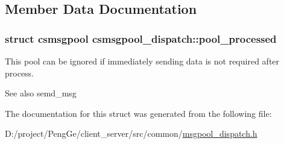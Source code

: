 \subsection{Member Data Documentation}
\hypertarget{structcsmsgpool__dispatch_adcf1e4f0175a47fcfc0283971dbdef57}{}
\subsubsection[{pool\+\_\+processed}]{\setlength{\rightskip}{0pt plus 5cm}struct {\bf csmsgpool} csmsgpool\+\_\+dispatch\+::pool\+\_\+processed}\label{structcsmsgpool__dispatch_adcf1e4f0175a47fcfc0283971dbdef57}


This pool can be ignored if immediately sending data is not required after process. 

\begin{DoxySeeAlso}{See also}
semd\+\_\+msg 
\end{DoxySeeAlso}


The documentation for this struct was generated from the following file\+:\begin{DoxyCompactItemize}
\item 
D\+:/project/\+Peng\+Ge/client\+\_\+server/src/common/\hyperlink{msgpool__dispatch_8h}{msgpool\+\_\+dispatch.\+h}\end{DoxyCompactItemize}
